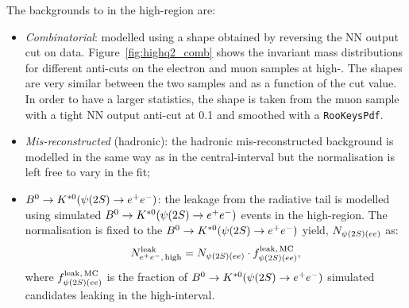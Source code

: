 The backgrounds to \BdToKstee in the high-\qsq region are:
%
\begin{itemize}

\item \textit{Combinatorial}: modelled using a shape obtained by reversing the NN output cut on data. 
Figure~\ref{fig:highq2_comb} shows the invariant mass distributions for different anti-cuts on the electron 
and muon samples at high-\qsq. The shapes are very similar between the two samples and as a function 
of the cut value. In order to have a larger statistics, the shape is taken from the muon sample with a tight
NN output anti-cut at 0.1 and smoothed with a \texttt{RooKeysPdf}.

\item \textit{Mis-reconstructed} (hadronic): the hadronic mis-reconstructed background is modelled in 
the same way as in the central-\qsq interval but the normalisation is left free to vary in the fit;

\item $\Bd\to\Kstarz(\psitwos\to\ee)$: the leakage from the \psitwos radiative tail is modelled using simulated 
$\Bd\to\Kstarz(\psitwos\to\ee)$ events in the high-\qsq region. The normalisation is fixed to 
the $\Bd\to\Kstarz(\psitwos\to\ee)$ yield, $N_{\psitwos(ee)}$ as:
%
$$N_{\ee, \, {\rm high}}^{\rm leak} = N_{\psitwos(ee)} \cdot f_{\psitwos(ee)}^{\rm leak, \,MC},$$
%
where $f_{\psitwos(ee)}^{\rm leak, \,MC}$ is the fraction of $\Bd\to\Kstarz(\psitwos\to\ee)$ simulated candidates
leaking in the high-\qsq interval.

\end{itemize}

